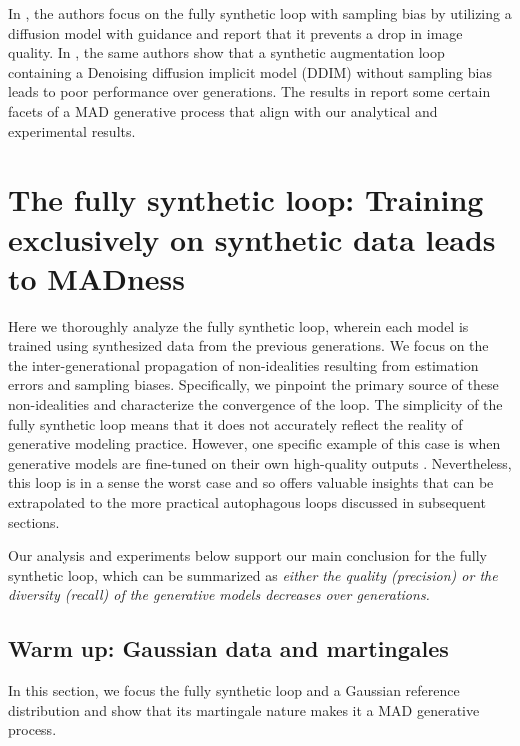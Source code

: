 \documentclass{article}
\def\colorSynthetic{colorA}
\def\colorMixed{colorB}
\def\synthetic{\textcolor{\colorSynthetic}{fully synthetic loop}}
\def\mixed{\textcolor{\colorMixed}{synthetic augmentation loop}}
\begin{document}
In \cite{towards_understanding}, the authors focus on the \synthetic{} with sampling bias by utilizing a diffusion model with guidance and report that it prevents a drop in image quality. 
In \cite{combining_generative}, the same authors show that a \mixed{} containing a Denoising diffusion implicit model (DDIM) \cite{song2021denoising} without sampling bias leads to poor performance over generations. The results in \cite{curse_of_recursion,towards_understanding,combining_generative} report some certain facets of a MAD generative process that align with our analytical and experimental results.



\section{The \synthetic{}: Training exclusively on synthetic data leads to MADness}
\label{sec:full}

Here we thoroughly analyze the \synthetic{}, wherein each model is trained using synthesized data from the previous generations. We focus on the the inter-generational propagation of non-idealities resulting from estimation errors and sampling biases. Specifically, we pinpoint the primary source of these non-idealities and characterize the convergence of the loop. 
The simplicity of the \synthetic{} means that it does not accurately reflect the reality of generative modeling practice.
However, one specific example of this case is when generative models are fine-tuned on their own high-quality outputs \cite{the_power_of_synthetic_data}.
Nevertheless, this loop is in a sense the worst case and so offers valuable insights that can be extrapolated to the more practical autophagous loops discussed in subsequent sections.

Our analysis and experiments below support our main conclusion for the \synthetic{}, which can be summarized as {\em either the quality (precision) or the diversity (recall) of the generative models decreases over generations.}



\subsection{Warm up: Gaussian data and martingales}

In this section, we focus the \synthetic{} and a Gaussian reference distribution and show that its martingale nature makes it a MAD generative process.
\end{document}

